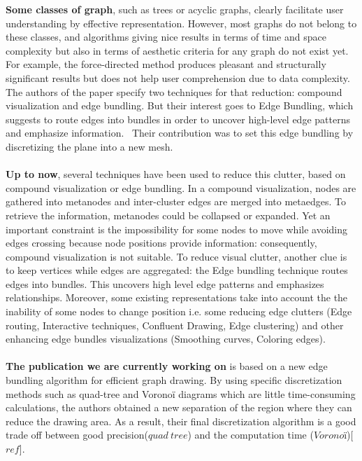 \textbf{Some classes of graph}, such as trees or acyclic graphs, clearly facilitate user understanding by effective representation. However, most graphs do not belong to these classes, and algorithms giving nice results in terms of time and space complexity but also in terms of aesthetic criteria for any graph do not exist yet. For example, the force-directed method produces pleasant and structurally significant results but does not help user comprehension due to data complexity. The authors of the paper specify two techniques for that reduction: compound visualization and edge bundling. But their interest goes to Edge Bundling, which suggests to route edges into bundles in order to uncover high-level edge patterns and emphasize information.~\cite{pd, pe} Their contribution was to set this edge bundling by discretizing the plane into a new mesh.
\\
\\
\textbf{Up to now}, several techniques have been used to reduce this clutter, based on compound visualization or edge bundling. In a compound visualization, nodes are gathered into metanodes and inter-cluster edges are merged into metaedges. To retrieve the information, metanodes could be collapsed or expanded. Yet an important constraint is the impossibility for some nodes to move while avoiding edges crossing because node positions provide information: consequently, compound visualization is not suitable. To reduce visual clutter, another clue is to keep vertices while edges are aggregated: the Edge bundling technique routes edges into bundles. This uncovers high level edge patterns and emphasizes relationships. Moreover, some existing representations take into account the the inability of some nodes to change position i.e.  some reducing edge clutters (Edge routing, Interactive techniques, Confluent Drawing, Edge clustering) and other enhancing edge bundles visualizations (Smoothing curves, Coloring edges). 
\\
\\
\textbf{The publication we are currently working on} is based on a new edge bundling algorithm for efficient graph drawing. By using specific  discretization methods such as quad-tree and Voronoï diagrams which are little time-consuming calculations, the authors obtained a new separation of the region where they can reduce the drawing area. As a result, their final discretization algorithm is a good trade off between good precision($quad~tree$) and the computation time ($Voronoï$)[$ref$].


